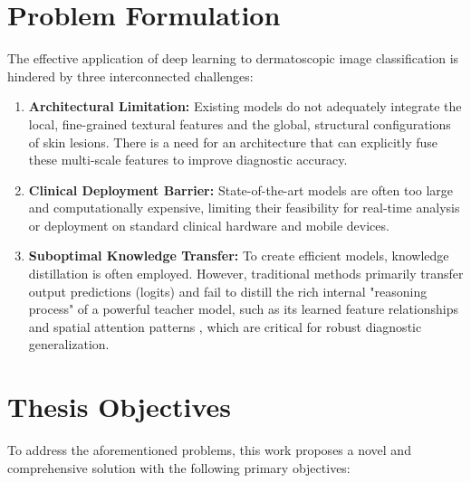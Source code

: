 \clearpage
\section{Problem Formulation}
\noindent The effective application of deep learning to dermatoscopic image classification is hindered by three interconnected challenges:

\begin{enumerate}
    \item \textbf{Architectural Limitation:} Existing models do not adequately integrate the local, fine-grained textural features and the global, structural configurations of skin lesions. There is a need for an architecture that can explicitly fuse these multi-scale features to improve diagnostic accuracy.
    \item \textbf{Clinical Deployment Barrier:} State-of-the-art models are often too large and computationally expensive, limiting their feasibility for real-time analysis or deployment on standard clinical hardware and mobile devices.
    \item \textbf{Suboptimal Knowledge Transfer:} To create efficient models, knowledge distillation is often employed. However, traditional methods \cite{shamshad2023survey} primarily transfer output predictions (logits) and fail to distill the rich internal "reasoning process" of a powerful teacher model, such as its learned feature relationships \cite{romero2014fitnets} and spatial attention patterns \cite{park2019relational}, which are critical for robust diagnostic generalization.
\end{enumerate}

\section{Thesis Objectives}
\noindent To address the aforementioned problems, this work proposes a novel and comprehensive solution with the following primary objectives:

